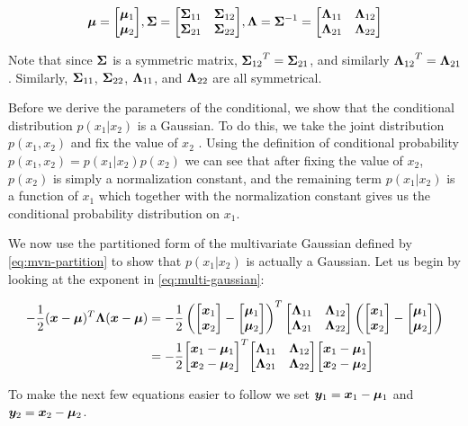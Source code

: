 \begin{equation}
\vmu = \partmu,
\mSigma = \partsigma, \mLambda = \mSigma^{-1} = \partlambda \label{eq:mvn-partition}
\end{equation}

Note that since $\mSigma$ is a symmetric matrix, $\ms{12}^T = \ms{21}$, and similarly $\ml{12}^T = \ml{21}$. Similarly, $\ms{11}$, $\ms{22}$, $\ml{11}$, and $\ml{22}$ are all symmetrical.

Before we derive the parameters of the conditional, we show that the conditional distribution $p(x_1 | x_2)$ is a Gaussian. To do this, we take the joint distribution $p(x_1, x_2)$ and fix the value of $x_2$ \citep{bishop2016pattern}. Using the definition of conditional probability $p(x_1, x_2) = p(x_1 | x_2) p(x_2)$ we can see that after fixing the value of $x_2$, $p(x_2)$ is simply a normalization constant, and the remaining term $p(x_1 | x_2)$ is a function of $x_1$ which together with the normalization constant gives us the conditional probability distribution on $x_1$.

We now use the partitioned form of the multivariate Gaussian defined by \eqref{eq:mvn-partition} to show that $p(x_1 | x_2)$ is actually a Gaussian. Let us begin by looking at the exponent in \eqref{eq:multi-gaussian}:

\begin{align}
-\frac{1}{2} (\vx - \vmu)^T \mLambda (\vx - \vmu) &= 
-\frac{1}{2} \left(\partx - \partmu \right)^T \partlambda \left(\partx - \partmu \right) \\
&= -\frac{1}{2} \partxmu^T \partlambda \partxmu
\end{align}

To make the next few equations easier to follow we set $\vy_1 = \vx_1 - \vmu_1$ and $\vy_2 = \vx_2 - \vmu_2$.

